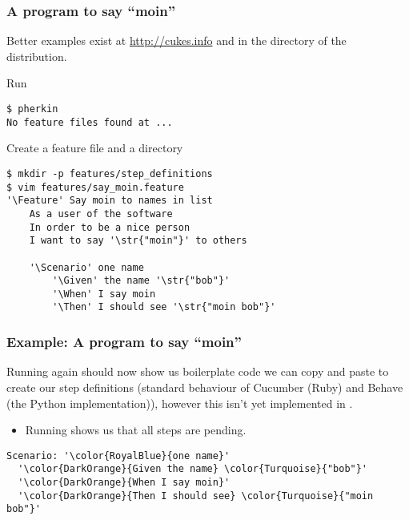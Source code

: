 \documentclass[10pt]{vcs_beamer}
\newcommand{\str}[1]{\color{Turquoise}{#1}}
\newcommand{\Feature}{\color{BlueViolet}{Feature:}}
\newcommand{\Scenario}{\color{BlueViolet}{Scenario:}}
\newcommand{\Given}{\color{DarkOrange}{Given}}
\newcommand{\When}{\color{RoyalBlue}{When}}
\newcommand{\Then}{\color{ForestGreen}{Then}}
\begin{document}
\begin{frame}[fragile]
\frametitle{A program to say ``moin''}

Better examples exist at {\footnotesize \url{http://cukes.info}} and in the
 directory of the  distribution.

Run 
\begin{lstlisting}
$ pherkin
No feature files found at ...
\end{lstlisting}

Create a feature file and a  directory
\begin{lstlisting}[escapeinside='']
$ mkdir -p features/step_definitions
$ vim features/say_moin.feature
'\Feature' Say moin to names in list
    As a user of the software
    In order to be a nice person
    I want to say '\str{"moin"}' to others

    '\Scenario' one name
        '\Given' the name '\str{"bob"}'
        '\When' I say moin
        '\Then' I should see '\str{"moin bob"}'
\end{lstlisting}

\end{frame}

\begin{frame}[fragile]
\frametitle{Example: A program to say ``moin''}

Running  again should now show us boilerplate code we can copy
and paste to create our step definitions (standard behaviour of Cucumber
(Ruby) and Behave (the Python implementation)), however this isn't yet
implemented in .

\begin{itemize}
    \item Running  shows us that all steps are pending.
\end{itemize}

\begin{lstlisting}[escapeinside='']
Scenario: '\color{RoyalBlue}{one name}'
  '\color{DarkOrange}{Given the name} \color{Turquoise}{"bob"}'
  '\color{DarkOrange}{When I say moin}'
  '\color{DarkOrange}{Then I should see} \color{Turquoise}{"moin bob"}'
\end{lstlisting}

\end{frame}
\end{document}

